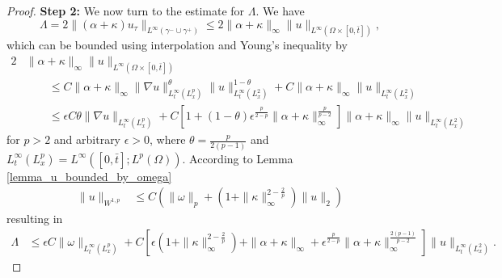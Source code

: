\documentclass{article}
\theoremstyle{definition}
\theoremstyle{definition}
\begin{document}
\begin{proof}
\medskip
\textbf{Step 2:}
We now turn to the estimate for $\Lambda$. We have 
\begin{equation*}
    \Lambda = 2\|(\alpha+\kappa)u_\tau\|_{L^\infty(\gamma^-\cup\gamma^+)}
    \leq 2 \|\alpha+\kappa\|_\infty\|u\|_{L^\infty(\Omega\times[0,\bar t])},
\end{equation*}
which can be bounded using interpolation and Young's inequality by
\begin{align*}
    2&\|\alpha+\kappa\|_\infty\|u\|_{L^\infty(\Omega\times[0,\bar t])} 
    \\
    &\qquad\leq C\|\alpha+\kappa\|_\infty\|\nabla u\|_{L^\infty_t (L^p_x)}^\theta \|u\|_{L^\infty_t (L^2_x)}^{1-\theta}+C\|\alpha+\kappa\|_{\infty}\|u\|_{L^\infty_t (L^2_x)}
    \\
    &\qquad\leq \epsilon C \theta \|\nabla u\|_{L^\infty_t (L^p_x)}+ C\left[1+(1-\theta)\epsilon^{\frac{p}{2-p}} \|\alpha+\kappa\|_{\infty}^{\frac{p}{p-2}}  \right] \|\alpha+\kappa\|_{\infty}\|u\|_{L^\infty_t (L^2_x)}
\end{align*}
for $p>2$ and arbitrary $\epsilon>0$, where $\theta= \frac{p}{2(p-1)}$ and $L_t^\infty(L_x^p)=L^\infty([0,\bar t];L^p(\Omega))$. According to Lemma \ref{lemma_u_bounded_by_omega}
\begin{align*}
    \| u \|_{W^{1,p}} &\leq C \left(\|\omega\|_p + \left(1+\|\kappa\|_\infty^{2-\frac{2}{p}}\right)\|u\|_2\right)
\end{align*}
resulting in
\begin{align*}
    \Lambda &\leq \epsilon C \|\omega\|_{L_t^\infty(L_x^p)} + C\left[\epsilon\left(1+\|\kappa\|_\infty^{2-\frac{2}{p}}\right)+\|\alpha+\kappa\|_{\infty}+\epsilon^{\frac{p}{2-p}} \|\alpha+\kappa\|_{\infty}^{\frac{2(p-1)}{p-2}}  \right] \|u\|_{L^\infty_t (L^2_x)}.
\end{align*}




\end{proof}
\end{document}

